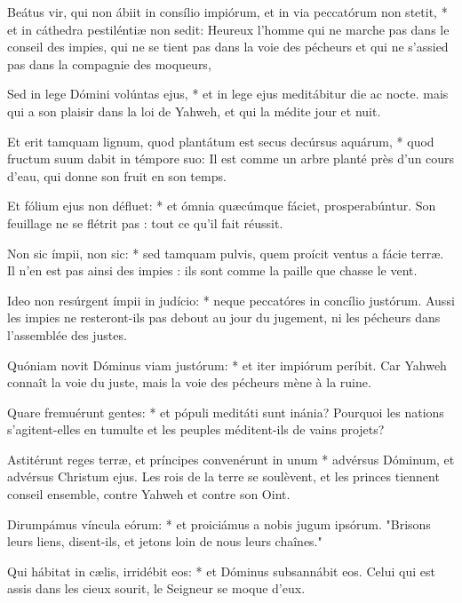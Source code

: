 \begin{paracol}{2}

\LigneParacol
{Beátus vir, qui non ábiit in consílio impiórum, et in via peccatórum non stetit, * et in cáthedra pestiléntiæ non sedit:}
{Heureux l'homme qui ne marche pas dans le conseil des impies, qui ne se tient pas dans la voie des pécheurs et qui ne s'assied pas dans la compagnie des moqueurs, }

\LigneParacol
{Sed in lege Dómini volúntas ejus, * et in lege ejus meditábitur die ac nocte.}
{mais qui a son plaisir dans la loi de Yahweh, et qui la médite jour et nuit. }

\LigneParacol
{Et erit tamquam lignum, quod plantátum est secus decúrsus aquárum, * quod fructum suum dabit in témpore suo:}
{Il est comme un arbre planté près d'un cours d'eau, qui donne son fruit en son temps.}

\LigneParacol
{Et fólium ejus non défluet: * et ómnia quæcúmque fáciet, prosperabúntur.}
{Son feuillage ne se flétrit pas : tout ce qu'il fait réussit. }

\LigneParacol
{Non sic ímpii, non sic: * sed tamquam pulvis, quem proícit ventus a fácie terræ.}
{Il n'en est pas ainsi des impies : ils sont comme la paille que chasse le vent. }

\LigneParacol
{Ideo non resúrgent ímpii in judício: * neque peccatóres in concílio justórum.}
{Aussi les impies ne resteront-ils pas debout au jour du jugement, ni les pécheurs dans l'assemblée des justes. }

\LigneParacol
{Quóniam novit Dóminus viam justórum: * et iter impiórum períbit.}
{Car Yahweh connaît la voie du juste, mais la voie des pécheurs mène à la ruine. }

\LigneParacol
{Quare fremuérunt gentes: * et pópuli meditáti sunt inánia?}
{Pourquoi les nations s'agitent-elles en tumulte et les peuples méditent-ils de vains projets? }

\LigneParacol
{Astitérunt reges terræ, et príncipes convenérunt in unum * advérsus Dóminum, et advérsus Christum ejus.}
{Les rois de la terre se soulèvent, et les princes tiennent conseil ensemble, contre Yahweh et contre son Oint. }

\LigneParacol
{Dirumpámus víncula eórum: * et proiciámus a nobis jugum ipsórum.}
{"Brisons leurs liens, disent-ils, et jetons loin de nous leurs chaînes." }

\LigneParacol
{Qui hábitat in cælis, irridébit eos: * et Dóminus subsannábit eos.}
{Celui qui est assis dans les cieux sourit, le Seigneur se moque d'eux. }


\end{paracol}
